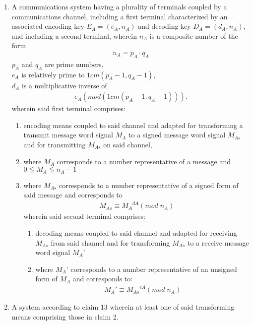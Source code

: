 \documentclass[12pt, a4paper]{article}
\begin{document}
\begin{enumerate}
\item A communications system having a plurality of terminals coupled by a communications channel, including a first terminal characterized by an associated encoding key $E_A =(e_A, n_A)$ and decoding key $D_A =(d_A, n_A)$, and including a second terminal, wherein $n_A$ is a composite number of the form
		\begin{gather*}
			n_A = p_A \cdot q_A
		\end{gather*}	
	$p_A$ and $q_A$ are prime numbers, \\
	$e_A$ is relatively prime to $1cm(p_A-1, q_A-1)$, \\
	$d_A$ is a multiplicative inverse of 
		\begin{gather*}
			e_A(mod(1cm(p_A-1, q_A-1))).
		\end{gather*}	
wherein said first terminal comprises:
	\begin{enumerate}
		\item	
		encoding means coupled to said channel and adapted for transforming a transmit message word signal $M_A$ to a signed message word signal $M_{As}$ and for transmitting $M_{As}$ on said channel,
		\item
where $M_A$ corresponds to a number representative of a message and
$0 \leqq M_A \leqq n_A-1$
		\item
where $M_{As}$ corresponds to a number representative of a signed form of said message and corresponds to
		\begin{gather*}
			M_{As} \equiv {M_A}^{dA} (mod \; n_A)
		\end{gather*}
wherein said second terminal comprises:
\begin{enumerate}
	\item
	decoding means coupled to said channel and adapted for receiving $M_{As}$ from said channel and for transforming $M_{As}$ to a receive message word signal $M_A$'

\item
where $M_A$' corresponds to a number representative of an unsigned form of $M_A$ and corresponds to:
		\begin{gather*}
			M_{A}' \equiv {M_{As}}^{eA} (mod \; n_A)
		\end{gather*}
		\end{enumerate}
	\end{enumerate}
	
\item A system according to claim 13 wherein at least one of said transforming means comprising those in claim 2.


\end{enumerate}
\end{document}
